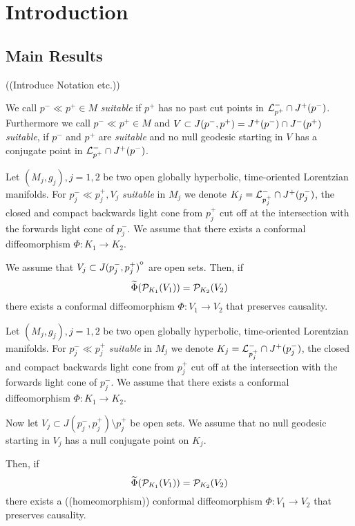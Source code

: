 \chapter{Introduction}

\section{Main Results}
((Introduce Notation etc.))

\begin{definition}[Suitable]
    We call $p^-\ll p^+\in M$  \emph{suitable} if $p^+$ has no past cut points in ${\mathcal{L}}^-_{p^+}\cap J^+(p^-)$. Furthermore we call $p^-\ll p^+\in M$ and $V\subset J(p^-,p^+) = J^+(p^-)\cap J^-(p^+)$ \emph{suitable}, if $p^-$ and $p^+$ are \emph{suitable} and no null geodesic starting in $V$ has a conjugate point in ${\mathcal{L}}^-_{p^+}\cap J^+(p^-)$.
\end{definition}

\begin{theorem}\label{thm:intreconstr}
    Let $(M_j,g_j), j=1,2$ be two open globally hyperbolic, time-oriented Lorentzian manifolds. For $p_j^-\ll p_j^+, V_j$ \emph{suitable} in $M_j$ we denote $K_j = {\mathcal{L}}^-_{p_j^+} \cap J^+(p_j^-)$, the closed and compact backwards light cone from $p_j^+$ cut off at the intersection with the forwards light cone of $p_j^-$. We assume that there exists a conformal diffeomorphism $\Phi:K_1\to K_2$. 
    
    We assume that $V_j\subset{\kern0ptJ(p_j^-,p_j^+)}^{\mathrm{o}}$ are open sets. 
    Then, if 
    \[
    \widetilde{\Phi}({\mathcal{P}}_{K_1}(V_1)) = {\mathcal{P}}_{K_2}(V_2)
    \]
    there exists a conformal diffeomorphism $\Phi:V_1\to V_2$ that preserves causality.
\end{theorem}


\begin{theorem}\label{thm:bdreconstr}
    Let $(M_j,g_j), j=1,2$ be two open globally hyperbolic, time-oriented Lorentzian manifolds. For $p_j^-\ll p_j^+$ \emph{suitable} in $M_j$ we denote $K_j = {\mathcal{L}}^-_{p_j^+} \cap J^+(p_j^-)$, the closed and compact backwards light cone from $p_j^+$ cut off at the intersection with the forwards light cone of $p_j^-$. We assume that there exists a conformal diffeomorphism $\Phi:K_1\to K_2$. 
    
    Now let $V_j\subset J(p_j^-,p_j^+) \setminus p_j^+$ be open sets. We assume that no null geodesic starting in $V_j$ has a null conjugate point on $K_j$. 
    
    Then, if 
    \[
    \widetilde{\Phi}({\mathcal{P}}_{K_1}(V_1)) = {\mathcal{P}}_{K_2}(V_2)
    \]
    there exists a ((homeomorphism)) conformal diffeomorphism $\Phi:V_1\to V_2$ that preserves causality.
\end{theorem}